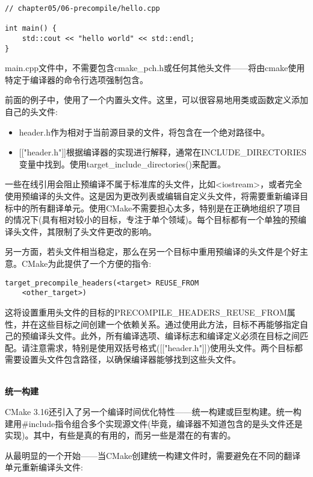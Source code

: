 \begin{lstlisting}[style=styleCXX]
// chapter05/06-precompile/hello.cpp

int main() {
	std::cout << "hello world" << std::endl;
}
\end{lstlisting} 

main.cpp文件中，不需要包含cmake\_pch.h或任何其他头文件——将由cmake使用特定于编译器的命令行选项强制包含。

前面的例子中，使用了一个内置头文件。这里，可以很容易地用类或函数定义添加自己的头文件:

\begin{itemize}
\item 
header.h作为相对于当前源目录的文件，将包含在一个绝对路径中。

\item 
{}[["header.h"]]根据编译器的实现进行解释，通常在INCLUDE\_DIRECTORIES变量中找到。使用target\_include\_directories()来配置。
\end{itemize}

一些在线引用会阻止预编译不属于标准库的头文件，比如<iostream>，或者完全使用预编译的头文件。这是因为更改列表或编辑自定义头文件，将需要重新编译目标中的所有翻译单元。使用CMake不需要担心太多，特别是在正确地组织了项目的情况下(具有相对较小的目标，专注于单个领域)。每个目标都有一个单独的预编译头文件，其限制了头文件更改的影响。

另一方面，若头文件相当稳定，那么在另一个目标中重用预编译的头文件是个好主意。CMake为此提供了一个方便的指令:

\begin{lstlisting}[style=styleCMake]
target_precompile_headers(<target> REUSE_FROM
	<other_target>)
\end{lstlisting}

这将设置重用头文件的目标的PRECOMPILE\_HEADERS\_REUSE\_FROM属性，并在这些目标之间创建一个依赖关系。通过使用此方法，目标不再能够指定自己的预编译头文件。此外，所有编译选项、编译标志和编译定义必须在目标之间匹配。请注意需求，特别是使用双括号格式([["header.h"]])使用头文件。两个目标都需要设置头文件包含路径，以确保编译器能够找到这些头文件。

\hspace*{\fill} \\ %
\noindent
\textbf{统一构建}

CMake 3.16还引入了另一个编译时间优化特性——统一构建或巨型构建。统一构建用\#include指令组合多个实现源文件(毕竟，编译器不知道包含的是头文件还是实现)。其中，有些是真的有用的，而另一些是潜在的有害的。

从最明显的一个开始——当CMake创建统一构建文件时，需要避免在不同的翻译单元重新编译头文件:

